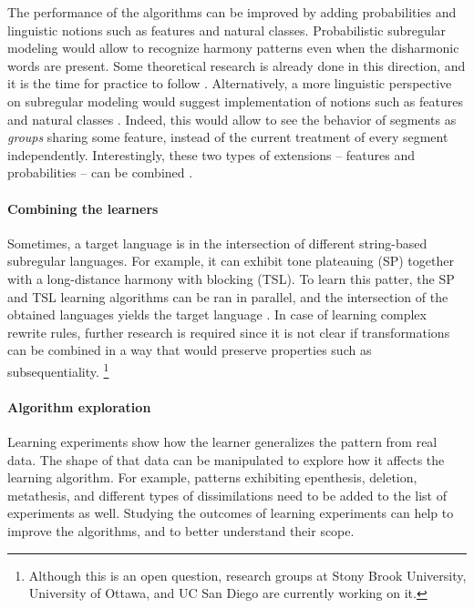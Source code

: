 The performance of the algorithms can be improved by adding probabilities and linguistic notions such as features and natural classes.
Probabilistic subregular modeling would allow to recognize harmony patterns even when the disharmonic words are present.
Some theoretical research is already done in this direction, and it is the time for practice to follow \citep{HeinzRogers2010SPdist,Shibata-Heinz-2019-MLEFRDSL}.
Alternatively, a more linguistic perspective on subregular modeling would suggest implementation of notions such as features and natural classes \citep{Strother-Garcia-HeinzEtAl-2016-UMTGICSP,chandlee-etal-2019-learning}.
Indeed, this would allow to see the behavior of segments as \emph{groups} sharing some feature, instead of the current treatment of every segment independently.
Interestingly, these two types of extensions -- features and probabilities -- can be combined \citep{Heinz-Koirala-2010-MLEFD,VuZehfrooshEtal2018-SRLUSM}.


\paragraph{Combining the learners}

Sometimes, a target language is in the intersection of different string-based subregular languages.
For example, it can exhibit tone plateauing (SP) together with a long-distance harmony with blocking (TSL).
To learn this patter, the SP and TSL learning algorithms can be ran in parallel, and the intersection of the obtained languages yields the target language \citep{Heinz10ldp,HeinzIdsardi13}.
In case of learning complex rewrite rules, further research is required since it is not clear if transformations can be combined in a way that would preserve properties such as subsequentiality.%
\footnote{Although this is an open question, research groups at Stony Brook University, University of Ottawa, and UC San Diego are currently working on it.}


\paragraph{Algorithm exploration}

Learning experiments show how the learner generalizes the pattern from real data.
The shape of that data can be manipulated to explore how it affects the learning algorithm.
For example, patterns exhibiting epenthesis, deletion, metathesis, and different types of dissimilations need to be added to the list of experiments as well.
Studying the outcomes of learning experiments can help to improve the algorithms, and to better understand their scope.


